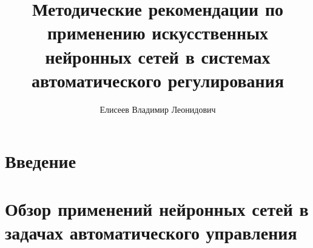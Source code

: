 \documentclass[12pt]{rusthesis}
\title{Методические рекомендации по применению искусственных нейронных
  сетей в системах автоматического регулирования}
\author{Елисеев Владимир Леонидович}
\begin{document}
\maketitle

\setcounter{tocdepth}{3}\tableofcontents

\chapter*{Введение}


\chapter{Обзор применений нейронных сетей в задачах автоматического управления}


%

\end{document}
